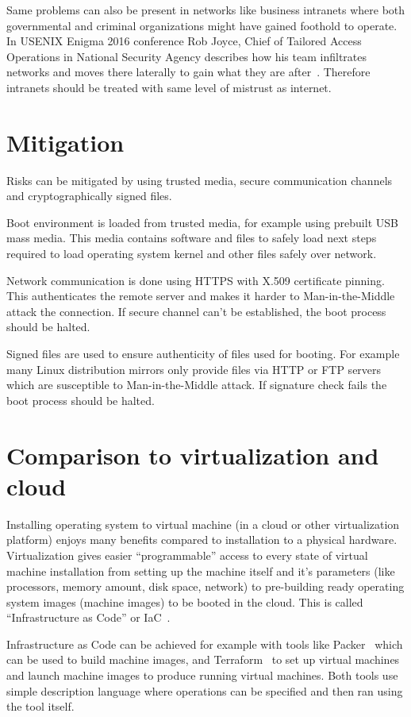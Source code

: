 Same problems can also be present in networks like business intranets
where both governmental and criminal organizations might have gained
foothold to operate. In USENIX Enigma 2016 conference Rob Joyce, Chief
of Tailored Access Operations in National Security Agency describes
how his team infiltrates networks and moves there laterally to gain
what they are after~\cite{nsa-tao}. Therefore intranets should be
treated with same level of mistrust as internet.


\section{Mitigation}

Risks can be mitigated by using trusted media, secure communication
channels and cryptographically signed files.

Boot environment is loaded from trusted media, for example using
prebuilt USB mass media. This media contains software and files to
safely load next steps required to load operating system kernel and
other files safely over network.

Network communication is done using HTTPS with X.509 certificate
pinning. This authenticates the remote server and makes it harder to
Man-in-the-Middle attack the connection. If secure channel can't be
established, the boot process should be halted.

Signed files are used to ensure authenticity of files used for
booting. For example many Linux distribution mirrors only provide
files via HTTP or FTP servers which are susceptible to
Man-in-the-Middle attack. If signature check fails the boot process
should be halted.


\section{Comparison to virtualization and cloud}

Installing operating system to virtual machine (in a cloud or other
virtualization platform) enjoys many benefits compared to installation
to a physical hardware. Virtualization gives easier ``programmable''
access to every state of virtual machine installation from setting up
the machine itself and it's parameters (like processors, memory
amount, disk space, network) to pre-building ready operating system
images (machine images) to be booted in the cloud. This is called
``Infrastructure as Code'' or IaC~\cite{spinellis}.

Infrastructure as Code can be achieved for example with tools like
Packer~\cite{packer} which can be used to build machine images, and
Terraform~\cite{terraform} to set up virtual machines and launch
machine images to produce running virtual machines. Both tools use
simple description language where operations can be specified and then
ran using the tool itself.

